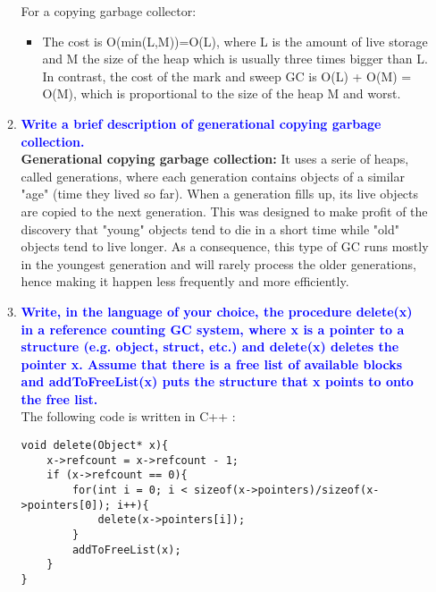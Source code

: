 \documentclass[10pt]{article}
\begin{document}
\begin{enumerate}
\begin{enumerate}
            For a copying garbage collector:
            \begin{itemize}
                \item The cost is O(min(L,M))=O(L), where L is the amount of live storage and M the size of the heap which is usually three times bigger than L. In contrast, the cost of the mark and sweep GC is O(L) + O(M) = O(M), which is proportional to the size of the heap M and worst.
            \end{itemize}
        \item \textbf{\textcolor{blue}{Write a brief description of generational copying garbage collection.}}
            \\ \textbf{Generational copying garbage collection:} It uses a serie of heaps, called generations, where each generation contains objects of a similar "age" (time they lived so far). When a generation fills up, its live objects are copied to the next generation. This was designed to make profit of the discovery that  "young" objects tend to die in a short time while "old" objects tend to live longer. As a consequence, this type of GC runs mostly in the youngest generation and will rarely process the older generations, hence making it happen less frequently and more efficiently.
        \item \textbf{\textcolor{blue}{Write, in the language of your choice, the procedure delete(x) in a reference counting GC system, where x is a pointer to a structure (e.g. object, struct, etc.) and delete(x) deletes the pointer x. Assume that there is a free list of available blocks and addToFreeList(x) puts the structure that x points to onto the free list.}}
        \\ The following code is written in C++ :
        \begin{verbatim}
void delete(Object* x){
    x->refcount = x->refcount - 1;
    if (x->refcount == 0){
        for(int i = 0; i < sizeof(x->pointers)/sizeof(x->pointers[0]); i++){
            delete(x->pointers[i]);
        }
        addToFreeList(x);
    }
}
        \end{verbatim}
    \end{enumerate}
\end{enumerate}
\end{document}
